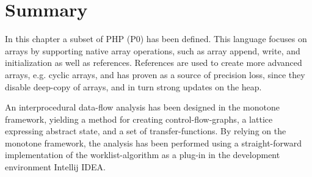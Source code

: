 \section{Summary}

In this chapter a subset of PHP (P0) has been defined. This language focuses on arrays by supporting native array operations, such as array append, write, and initialization as well as references. %
References are used to create more advanced arrays, e.g. cyclic arrays, and has proven as a source of precision loss, since they disable deep-copy of arrays, and in turn strong updates on the heap. 

An interprocedural data-flow analysis has been designed in the monotone framework, yielding a method for creating control-flow-graphs, a lattice expressing abstract state, and a set of transfer-functions. By relying on the monotone framework, the analysis has been performed using a straight-forward implementation of the worklist-algorithm as a plug-in in the development environment Intellij IDEA. 

